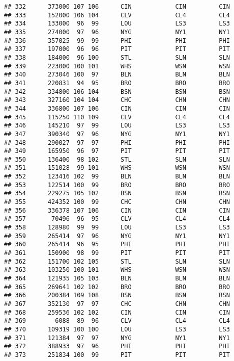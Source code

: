 \documentclass[]{article}
\begin{document}
\begin{verbatim}
## 332      373000 107 106      CIN            CIN         CIN
## 333      152000 106 104      CLV            CL4         CL4
## 334      133000  96  99      LOU            LS3         LS3
## 335      274000  97  96      NYG            NY1         NY1
## 336      357025  99  99      PHI            PHI         PHI
## 337      197000  96  96      PIT            PIT         PIT
## 338      184000  96 100      STL            SLN         SLN
## 339      223000 100 101      WHS            WSN         WSN
## 340      273046 100  97      BLN            BLN         BLN
## 341      220831  94  95      BRO            BRO         BRO
## 342      334800 106 104      BSN            BSN         BSN
## 343      327160 104 104      CHC            CHN         CHN
## 344      336800 107 106      CIN            CIN         CIN
## 345      115250 110 109      CLV            CL4         CL4
## 346      145210  97  99      LOU            LS3         LS3
## 347      390340  97  96      NYG            NY1         NY1
## 348      290027  97  97      PHI            PHI         PHI
## 349      165950  96  97      PIT            PIT         PIT
## 350      136400  98 102      STL            SLN         SLN
## 351      151028  99 101      WHS            WSN         WSN
## 352      123416 102  99      BLN            BLN         BLN
## 353      122514 100  99      BRO            BRO         BRO
## 354      229275 105 102      BSN            BSN         BSN
## 355      424352 100  99      CHC            CHN         CHN
## 356      336378 107 106      CIN            CIN         CIN
## 357       70496  96  95      CLV            CL4         CL4
## 358      128980  99  99      LOU            LS3         LS3
## 359      265414  97  96      NYG            NY1         NY1
## 360      265414  96  95      PHI            PHI         PHI
## 361      150900  98  99      PIT            PIT         PIT
## 362      151700 102 105      STL            SLN         SLN
## 363      103250 100 101      WHS            WSN         WSN
## 364      121935 105 103      BLN            BLN         BLN
## 365      269641 102 102      BRO            BRO         BRO
## 366      200384 109 108      BSN            BSN         BSN
## 367      352130  97  97      CHC            CHN         CHN
## 368      259536 102 102      CIN            CIN         CIN
## 369        6088  89  96      CLV            CL4         CL4
## 370      109319 100 100      LOU            LS3         LS3
## 371      121384  97  97      NYG            NY1         NY1
## 372      388933  97  96      PHI            PHI         PHI
## 373      251834 100  99      PIT            PIT         PIT

\end{verbatim}
\end{document}
